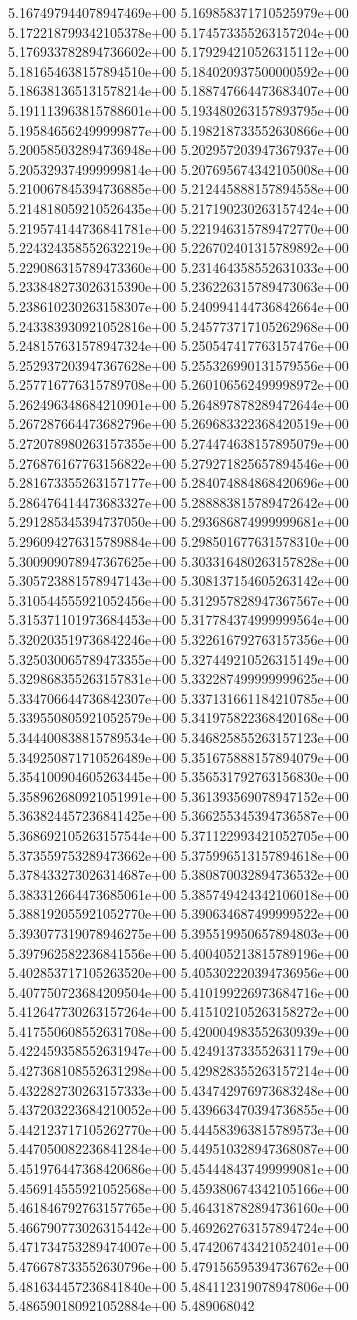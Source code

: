 5.167497944078947469e+00	5.169858371710525979e+00	5.172218799342105378e+00	5.174573355263157204e+00	5.176933782894736602e+00	5.179294210526315112e+00	5.181654638157894510e+00	5.184020937500000592e+00	5.186381365131578214e+00	5.188747664473683407e+00	5.191113963815788601e+00	5.193480263157893795e+00	5.195846562499999877e+00	5.198218733552630866e+00	5.200585032894736948e+00	5.202957203947367937e+00	5.205329374999999814e+00	5.207695674342105008e+00	5.210067845394736885e+00	5.212445888157894558e+00	5.214818059210526435e+00	5.217190230263157424e+00	5.219574144736841781e+00	5.221946315789472770e+00	5.224324358552632219e+00	5.226702401315789892e+00	5.229086315789473360e+00	5.231464358552631033e+00	5.233848273026315390e+00	5.236226315789473063e+00	5.238610230263158307e+00	5.240994144736842664e+00	5.243383930921052816e+00	5.245773717105262968e+00	5.248157631578947324e+00	5.250547417763157476e+00	5.252937203947367628e+00	5.255326990131579556e+00	5.257716776315789708e+00	5.260106562499998972e+00	5.262496348684210901e+00	5.264897878289472644e+00	5.267287664473682796e+00	5.269683322368420519e+00	5.272078980263157355e+00	5.274474638157895079e+00	5.276876167763156822e+00	5.279271825657894546e+00	5.281673355263157177e+00	5.284074884868420696e+00	5.286476414473683327e+00	5.288883815789472642e+00	5.291285345394737050e+00	5.293686874999999681e+00	5.296094276315789884e+00	5.298501677631578310e+00	5.300909078947367625e+00	5.303316480263157828e+00	5.305723881578947143e+00	5.308137154605263142e+00	5.310544555921052456e+00	5.312957828947367567e+00	5.315371101973684453e+00	5.317784374999999564e+00	5.320203519736842246e+00	5.322616792763157356e+00	5.325030065789473355e+00	5.327449210526315149e+00	5.329868355263157831e+00	5.332287499999999625e+00	5.334706644736842307e+00	5.337131661184210785e+00	5.339550805921052579e+00	5.341975822368420168e+00	5.344400838815789534e+00	5.346825855263157123e+00	5.349250871710526489e+00	5.351675888157894079e+00	5.354100904605263445e+00	5.356531792763156830e+00	5.358962680921051991e+00	5.361393569078947152e+00	5.363824457236841425e+00	5.366255345394736587e+00	5.368692105263157544e+00	5.371122993421052705e+00	5.373559753289473662e+00	5.375996513157894618e+00	5.378433273026314687e+00	5.380870032894736532e+00	5.383312664473685061e+00	5.385749424342106018e+00	5.388192055921052770e+00	5.390634687499999522e+00	5.393077319078946275e+00	5.395519950657894803e+00	5.397962582236841556e+00	5.400405213815789196e+00	5.402853717105263520e+00	5.405302220394736956e+00	5.407750723684209504e+00	5.410199226973684716e+00	5.412647730263157264e+00	5.415102105263158272e+00	5.417550608552631708e+00	5.420004983552630939e+00	5.422459358552631947e+00	5.424913733552631179e+00	5.427368108552631298e+00	5.429828355263157214e+00	5.432282730263157333e+00	5.434742976973683248e+00	5.437203223684210052e+00	5.439663470394736855e+00	5.442123717105262770e+00	5.444583963815789573e+00	5.447050082236841284e+00	5.449510328947368087e+00	5.451976447368420686e+00	5.454448437499999081e+00	5.456914555921052568e+00	5.459380674342105166e+00	5.461846792763157765e+00	5.464318782894736160e+00	5.466790773026315442e+00	5.469262763157894724e+00	5.471734753289474007e+00	5.474206743421052401e+00	5.476678733552630796e+00	5.479156595394736762e+00	5.481634457236841840e+00	5.484112319078947806e+00	5.486590180921052884e+00	5.489068042